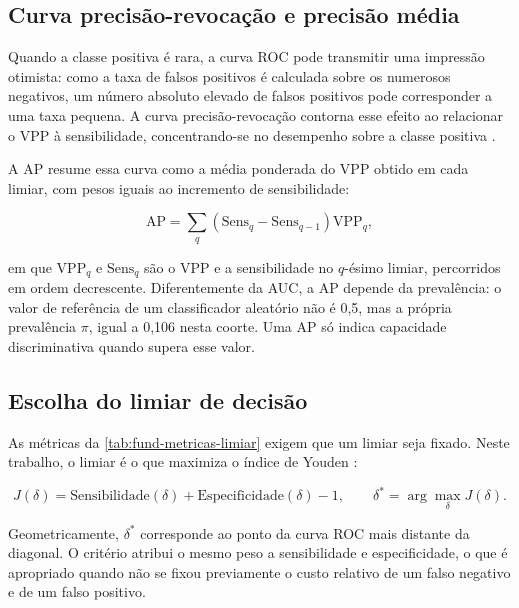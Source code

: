 \subsection{Curva precisão-revocação e precisão média}
\label{subsec:fund-ap}

Quando a classe positiva é rara, a curva ROC pode transmitir uma impressão
otimista: como a taxa de falsos positivos é calculada sobre os numerosos
negativos, um número absoluto elevado de falsos positivos pode corresponder a
uma taxa pequena. A curva precisão-revocação contorna esse efeito ao
relacionar o \gls{VPP} à sensibilidade, concentrando-se no desempenho sobre a
classe positiva \cite{saito2015precision, davis2006relationship}.

A \gls{AP} resume essa curva como a média ponderada do \gls{VPP} obtido em
cada limiar, com pesos iguais ao incremento de sensibilidade:

\begin{equation}
	\mathrm{AP} = \sum_{q} \left( \mathrm{Sens}_q - \mathrm{Sens}_{q-1} \right) \mathrm{VPP}_q,
	\label{eq:ap}
\end{equation}

\noindent
em que $\mathrm{VPP}_q$ e $\mathrm{Sens}_q$ são o \gls{VPP} e a sensibilidade
no $q$-ésimo limiar, percorridos em ordem decrescente. Diferentemente da \gls{AUC}, a \gls{AP}
depende da prevalência: o valor de referência de um classificador aleatório
não é 0,5, mas a própria prevalência $\pi$, igual a 0,106 nesta coorte. Uma
\gls{AP} só indica capacidade discriminativa quando supera esse valor.

\subsection{Escolha do limiar de decisão}
\label{subsec:fund-youden}

As métricas da \autoref{tab:fund-metricas-limiar} exigem que um limiar seja
fixado. Neste trabalho, o limiar é o que maximiza o índice de Youden
\cite{youden1950index}:

\begin{equation}
	J(\delta) = \mathrm{Sensibilidade}(\delta) + \mathrm{Especificidade}(\delta) - 1,
	\qquad
	\delta^{*} = \arg\max_{\delta} J(\delta).
	\label{eq:youden}
\end{equation}

\noindent
Geometricamente, $\delta^{*}$ corresponde ao ponto da curva ROC mais distante
da diagonal. O critério atribui o mesmo peso a sensibilidade e
especificidade, o que é apropriado quando não se fixou previamente o custo
relativo de um falso negativo e de um falso positivo.

